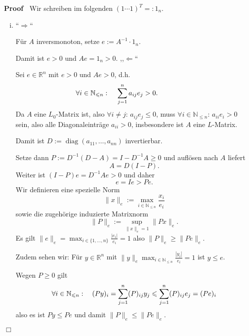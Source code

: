 \documentclass{book}
\newcommand{\assign}{:=}
\newcommand{\backassign}{=:}
\newcommand{\tmop}[1]{\ensuremath{\operatorname{#1}}}
\newenvironment{enumerateroman}{\begin{enumerate}[i.] }{\end{enumerate}}
\newenvironment{proof}{\noindent\textbf{Proof\ }}{\hspace*{\fill}$\Box$\medskip}
\begin{document}
\begin{proof}
  Wir schreiben im folgenden $(1 \cdots 1)^T \backassign \mathscr{1}_n$.
  \begin{enumerateroman}
    \item ``$\Rightarrow$``
    
    F{\"u}r $A$ inversmonoton, setze $e \assign A^{- 1} \cdot \mathscr{1}_n$.
    
    Damit ist $e > 0$ und $A e = \mathscr{1}_n > 0$.{\hspace{20em}}
    ,,$\Leftarrow$``
    
    Sei $e \in \mathbb{R}^n$ mit $e > 0$ und $A e > 0$, d.h.
    \[ \forall i \in \mathbb{N}_{\leqslant n} : \text{\quad} \sum_{j = 1}^n
       a_{i j} e_j > 0. \hspace{5em} \]
    {\hspace{1.7em}}Da $A$ eine $L_0$-Matrix ist, also $\forall i \neq j$:
    $a_{i j} e_j \leq 0$, muss $\forall i \in \mathbb{N}_{\leqslant n}$: $a_{i
    i} e_i > 0$ sein, also alle Diagonaleintr{\"a}ge $a_{i i} > 0$,
    insbesondere ist $A$ eine $L$-Matrix.
    
    Damit ist $D \assign \tmop{diag} (a_{11}, \ldots, a_{n n})$ invertierbar.
    
    Setze dann $P \assign D^{- 1} (D - A) = I - D^{- 1} A \geqslant 0$ und
    aufl{\"o}sen nach $A$ liefert
    \[ A = D (I - P) . \]
    {\hspace{1.7em}}Weiter ist $(I - P) e = D^{- 1} A e > 0$ und daher
    \begin{equation}
      e = I e > P e.
    \end{equation}
    {\hspace{1.7em}}Wir definieren eine spezielle Norm \
    \[ \| x \|_e \assign \max_{i \in \mathbb{N}_{\leqslant n}}
       \frac{x_i}{e_i} \]
    sowie die zugeh{\"o}rige induzierte Matrixnorm
    \[ \| P \|_e \assign \sup_{\| x \|_e = 1} \| P x \|_e . \]
    {\hspace{1.7em}}Es gilt $\| e \|_e = \max_{i \in \{ 1, \ldots, n \}}
    \frac{| e_i |}{e_i} = 1$ also $\| P \|_e \geqslant \| P e \|_e$.
    
    Zudem sehen wir: F{\"u}r $y \in \mathbb{R}^n$ mit $\| y \|_e \max_{i \in
    \mathbb{N}_{\leqslant n}} \frac{| y_i |}{e_i} = 1$ ist $y \leqslant e$.
    
    Wegen $P \geqslant 0$ gilt
    \[ \forall i \in \mathbb{N}_{\leqslant n} : \text{\quad$(P y)_i = \sum_{j
       = 1}^n (P)_{i j} y_j \leqslant \sum_{j = 1}^n (P)_{i j} e_j = (P e)_i$}
    \]
    also es ist $P y \leq P e$ und damit $\| P \|_e \leqslant \| P e \|_e$.
    

\end{enumerateroman}
\end{proof}
\end{document}
